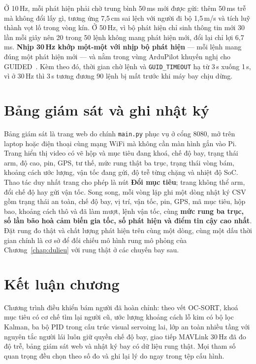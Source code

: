 Ở 10\,Hz, mỗi phát hiện phải chờ trung bình 50\,ms mới được gửi: thêm 50\,ms trễ mà không đổi lấy gì, tương ứng 7,5\,cm sai lệch với người đi bộ 1,5\,m/s và tích luỹ thành vọt lố trong vòng kín. Ở 50\,Hz, vì bộ phát hiện chỉ sinh thông tin mới 30 lần mỗi giây nên 20 trong 50 lệnh không mang phát hiện mới, đổi lại chỉ lợi 6,7\,ms. \textbf{Nhịp 30\,Hz khớp một-một với nhịp bộ phát hiện} --- mỗi lệnh mang đúng một phát hiện mới --- và nằm trong vùng ArduPilot khuyến nghị cho GUIDED~\cite{ardupilot}. Kèm theo đó, thời gian chờ lệnh và \texttt{GUID\_TIMEOUT} hạ từ 3\,s xuống 1\,s, vì ở 30\,Hz thì 3\,s tương đương 90 lệnh bị mất trước khi máy bay chịu dừng.

\section{Bảng giám sát và ghi nhật ký}

Bảng giám sát là trang web do chính \texttt{main.py} phục vụ ở cổng 8080, mở trên laptop hoặc điện thoại cùng mạng WiFi mà không cần màn hình gắn vào Pi. Trang hiển thị video có vẽ hộp và mục tiêu đang khoá, chế độ bay, trạng thái arm, độ cao, pin, GPS, tư thế, mức rung thật ba trục, trạng thái vòng bám, khoảng cách ước lượng, vận tốc đang gửi, độ trễ từng chặng và nhiệt độ SoC. Thao tác duy nhất trang cho phép là nút \textbf{Đổi mục tiêu}; trang không thể arm, đổi chế độ hay gửi vận tốc. Song song, mỗi vòng lặp ghi một dòng nhật ký CSV gồm trạng thái an toàn, chế độ bay, vị trí, vận tốc, pin, GPS, mã mục tiêu, hộp bao, khoảng cách thô và đã làm mượt, lệnh vận tốc, cùng \textbf{mức rung ba trục, số lần bão hoà cảm biến gia tốc, số phát hiện và điểm tin cậy cao nhất}. Đặt rung đo thật và chất lượng phát hiện trên cùng một dòng, cùng một dấu thời gian chính là cơ sở để đối chiếu mô hình rung mô phỏng của Chương~\ref{chap:dulieu} với rung thật ở các chuyến bay sau.

\section{Kết luận chương}

Chương trình điều khiển bám người đã hoàn chỉnh: theo vết OC-SORT, khoá mục tiêu có cơ chế tìm lại người cũ, ước lượng khoảng cách lỗ kim có bộ lọc Kalman, ba bộ PID trong cấu trúc visual servoing lai, lớp an toàn nhiều tầng với nguyên tắc người lái luôn giữ quyền chế độ bay, giao tiếp MAVLink 30\,Hz đã đo độ trễ, bảng giám sát web và nhật ký bay có dữ liệu rung thật. Mọi tham số quan trọng đều chọn theo số đo và ghi lại lý do ngay trong tệp cấu hình.
